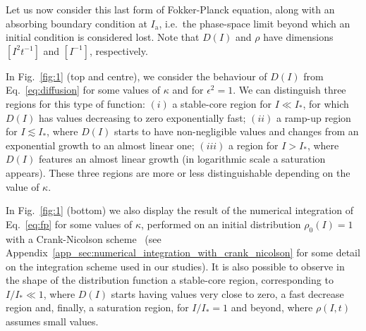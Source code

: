 Let us now consider this last form of Fokker-Planck equation, along with an absorbing boundary condition at $I_{\mathrm{a}}$, i.e.\ the phase-space limit beyond which an initial condition is considered lost. Note that $D(I)$ and $\rho$ have dimensions $[I^2t^{-1}]$ and $[I^{-1}]$, respectively.

In Fig.~\ref{fig:1} (top and centre), we consider the behaviour of $D(I)$ from Eq.~\eqref{eq:diffusion} for some values of $\kappa$ and for $\epsilon^2 = 1$. We can distinguish three regions for this type of function: $(i)$ a stable-core region for $I \ll I_\ast$, for which $D(I)$ has values decreasing to zero exponentially fast; $(ii)$ a ramp-up region for $I \lesssim I_\ast$, where $D(I)$ starts to have non-negligible values and changes from an exponential growth to an almost linear one; $(iii)$ a region for $I >  I_\ast$, where $D(I)$ features an almost linear growth (in logarithmic scale a saturation appears). These three regions are more or less distinguishable depending on the value of $\kappa$. 

In Fig.~\ref{fig:1} (bottom) we also display the result of the numerical integration of Eq.~\eqref{eq:fp} for some values of $\kappa$, performed on an initial distribution $\rho_0(I)=1$ with a Crank-Nicolson scheme~\cite{crank1947practical} (see Appendix~\ref{app_sec:numerical_integration_with_crank_nicolson} for some detail on the integration scheme used in our studies).
It is also possible to observe in the shape of the distribution function a stable-core region, corresponding to $I/I_\ast \ll 1$, where $D(I)$ starts having values very close to zero, a fast decrease region and, finally, a saturation region, for $I/I_\ast = 1$ and beyond, where $\rho(I, t)$ assumes small values.

